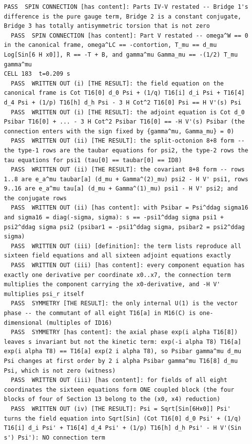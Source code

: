 \begin{Verbatim}[fontsize=\scriptsize]
  PASS  SPIN CONNECTION [has content]: Parts IV-V restated -- Bridge 1's difference is the pure gauge term, Bridge 2 is a constant conjugate, Bridge 3 has totally antisymmetric torsion that is not zero
  PASS  SPIN CONNECTION [has content]: Part V restated -- omega^W == 0 in the canonical frame, omega^LC == -contortion, T_mu == d_mu Log[Sin[6 H x0]], R == -T + B, and gamma^mu Gamma_mu == -(1/2) T_mu gamma^mu
CELL 183  t=0.209 s
  PASS  WRITTEN OUT (i) [THE RESULT]: the field equation on the canonical frame is Cot T16[0] d_0 Psi + (1/q) T16[i] d_i Psi + T16[4] d_4 Psi + (1/p) T16[h] d_h Psi - 3 H Cot^2 T16[0] Psi == H V'(s) Psi
  PASS  WRITTEN OUT (i) [THE RESULT]: the adjoint equation is Cot d_0 Psibar T16[0] + ... - 3 H Cot^2 Psibar T16[0] == -H V'(s) Psibar (the connection enters with the sign fixed by {gamma^mu, Gamma_mu} = 0)
  PASS  WRITTEN OUT (ii) [THE RESULT]: the split-octonion 8+8 form -- the type-1 rows are the taubar equations for psi2, the type-2 rows the tau equations for psi1 (tau[0] == taubar[0] == ID8)
  PASS  WRITTEN OUT (ii) [THE RESULT]: the covariant 8+8 form -- rows 1..8 are e_a^mu taubar[a] (d_mu + Gamma^(2)_mu) psi2 - H V' psi1, rows 9..16 are e_a^mu tau[a] (d_mu + Gamma^(1)_mu) psi1 - H V' psi2; and the conjugate rows
  PASS  WRITTEN OUT (ii) [has content]: with Psibar = Psi^ddag sigma16 and sigma16 = diag(-sigma, sigma): s == -psi1^ddag sigma psi1 + psi2^ddag sigma psi2 (psibar1 = -psi1^ddag sigma, psibar2 = psi2^ddag sigma)
  PASS  WRITTEN OUT (iii) [definition]: the term lists reproduce all sixteen field equations and all sixteen adjoint equations exactly
  PASS  WRITTEN OUT (iii) [has content]: every component equation has exactly one derivative per coordinate x0..x7, the connection term multiplies the component carrying the x0-derivative, and -H V' multiplies psi_r itself
  PASS  SYMMETRY [THE RESULT]: the only internal U(1) is the vector phase -- the commutant of all eight T16[a] in M16(C) is one-dimensional (multiples of ID16)
  PASS  SYMMETRY [has content]: the axial phase exp(i alpha T16[8]) leaves s invariant but not the kinetic term: exp(-i alpha T8) T16[a] exp(i alpha T8) == T16[a] exp(2 i alpha T8), so Psibar gamma^mu d_mu Psi changes at first order by 2 i alpha Psibar gamma^mu T16[8] d_mu Psi, which is not zero (witness)
  PASS  WRITTEN OUT (iii) [has content]: for fields of all eight coordinates the sixteen equations form ONE coupled block (the four blocks of four of Section 13 belong to the (x0, x4) reduction)
  PASS  WRITTEN OUT (iv) [THE RESULT]: Psi = Sqrt[Sin[6Hx0]] Psi' turns the field equation into Sqrt[Sin] (Cot T16[0] d_0 Psi' + (1/q) T16[i] d_i Psi' + T16[4] d_4 Psi' + (1/p) T16[h] d_h Psi' - H V'(Sin s') Psi'): NO connection term

\end{Verbatim}
